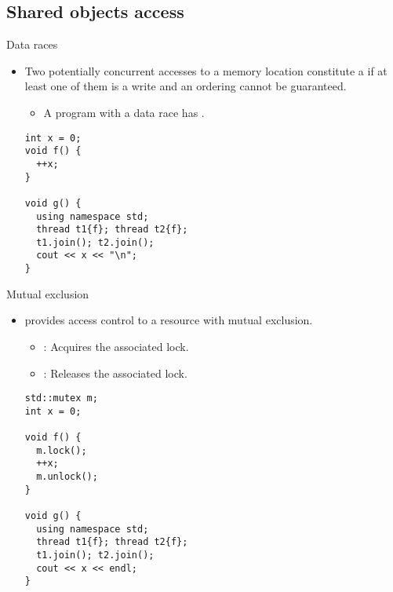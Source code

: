 \subsection{Shared objects access}

\begin{frame}[t,fragile]{Data races}
\begin{itemize}
  \item Two potentially concurrent accesses to a memory location constitute
        a  if at least one of them is a write and 
        an ordering cannot be guaranteed.
    \begin{itemize}
      \item A program with a data race has .
    \end{itemize}
\pause
\begin{lstlisting}
int x = 0;
void f() {
  ++x;
}

void g() {
  using namespace std;
  thread t1{f}; thread t2{f};
  t1.join(); t2.join();
  cout << x << "\n";
}
\end{lstlisting}
\end{itemize}
\end{frame}

\begin{frame}[t,fragile]{Mutual exclusion}
\begin{itemize}
  \item {} provides access control to a resource with mutual exclusion.
    \begin{itemize}
      \item {}: Acquires the associated lock.
      \item {}: Releases the associated lock.
    \end{itemize}
\begin{lstlisting}
std::mutex m;
int x = 0;

void f() {
  m.lock();
  ++x;
  m.unlock();
}

void g() {
  using namespace std;
  thread t1{f}; thread t2{f};
  t1.join(); t2.join();
  cout << x << endl;
}
\end{lstlisting}
\end{itemize}
\end{frame}

